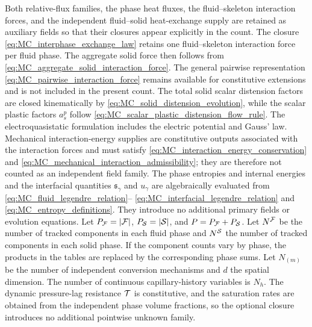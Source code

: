 Both relative-flux families, the phase heat fluxes, the fluid--skeleton
interaction forces, and the independent fluid--solid heat-exchange supply are
retained as auxiliary fields so that their closures appear explicitly in the
count.  The closure \eqref{eq:MC_interphase_exchange_law} retains one
fluid--skeleton interaction force per fluid phase.  The aggregate solid force
then follows from \eqref{eq:MC_aggregate_solid_interaction_force}.  The general
pairwise representation \eqref{eq:MC_pairwise_interaction_force} remains
available for constitutive extensions and is not included in the present
count.  The total solid scalar distension
factors are closed kinematically by
\eqref{eq:MC_solid_distension_evolution}, while the scalar plastic factors
\(a_s^p\) follow \eqref{eq:MC_scalar_plastic_distension_flow_rule}.  The
electroquasistatic formulation includes the electric potential and Gauss' law.
Mechanical interaction-energy supplies are constitutive outputs associated
with the interaction forces and must satisfy
\eqref{eq:MC_interaction_energy_conservation} and
\eqref{eq:MC_mechanical_interaction_admissibility}; they are therefore not
counted as an independent field family.
The phase entropies and internal energies and the interfacial quantities
\(\mathfrak{s}_\gamma\) and \(u_\gamma\) are algebraically evaluated from
\eqref{eq:MC_fluid_legendre_relation}--%
\eqref{eq:MC_interfacial_legendre_relation} and
\eqref{eq:MC_entropy_definitions}.  They introduce no additional primary
fields or evolution equations.
Let \(P_{\mathcal{F}}=|\mathcal{F}|\), \(P_{\mathcal{S}}=|\mathcal{S}|\), and
\(P=P_{\mathcal{F}}+P_{\mathcal{S}}\).  Let \(N^{\mathcal{F}}\) be the number of tracked
components in each fluid phase and \(N^{\mathcal{S}}\) the number of tracked
components in each solid phase.  If the component counts vary by phase, the
products in the tables are replaced by the corresponding phase sums.  Let \(N_{(m)}\)
be the number of independent conversion mechanisms and \(d\) the spatial
dimension.  The number of continuous capillary-history variables is \(N_h\).
The dynamic pressure-lag resistance \(\mathcal{T}\) is constitutive, and the
saturation rates are obtained from the independent phase volume fractions, so
the optional closure introduces no additional pointwise unknown family.


